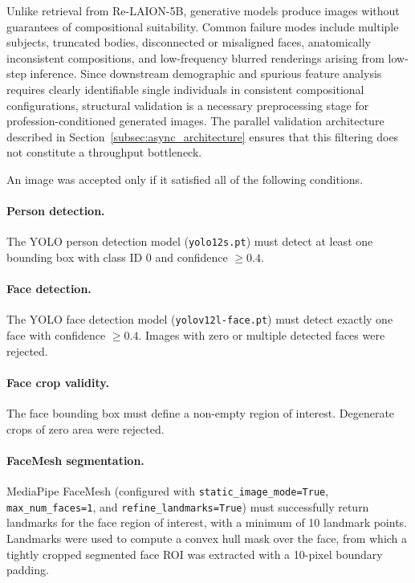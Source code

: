 Unlike retrieval from Re-LAION-5B, generative models produce images without
guarantees of compositional suitability. Common failure modes include
multiple subjects, truncated bodies, disconnected or misaligned faces,
anatomically inconsistent compositions, and low-frequency blurred
renderings arising from low-step inference. Since downstream demographic
and spurious feature analysis requires clearly identifiable single
individuals in consistent compositional configurations, structural
validation is a necessary preprocessing stage for profession-conditioned
generated images. The parallel validation architecture described in
Section~\ref{subsec:async_architecture} ensures that this filtering does
not constitute a throughput bottleneck.

An image was accepted only if it satisfied all of the following conditions.

\paragraph{Person detection.} The YOLO person detection model
(\texttt{yolo12s.pt}) must detect at least one bounding box with class ID
0 and confidence $\geq 0.4$.

\paragraph{Face detection.} The YOLO face detection model
(\texttt{yolov12l-face.pt}) must detect exactly one face with confidence
$\geq 0.4$. Images with zero or multiple detected faces were rejected.

\paragraph{Face crop validity.} The face bounding box must define a
non-empty region of interest. Degenerate crops of zero area were rejected.

\paragraph{FaceMesh segmentation.} MediaPipe FaceMesh (configured with
\texttt{static\_image\_mode=True}, \texttt{max\_num\_faces=1}, and
\texttt{refine\_landmarks=True}) must successfully return landmarks for the
face region of interest, with a minimum of 10 landmark points. Landmarks
were used to compute a convex hull mask over the face, from which a tightly
cropped segmented face ROI was extracted with a 10-pixel boundary padding.

